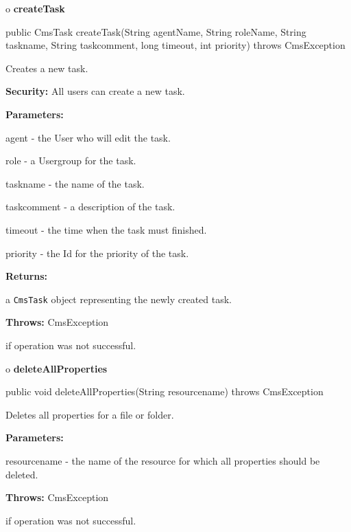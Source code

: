 o {\bf createTask}

\begin{PRE}
 public CmsTask createTask(String agentName,
                           String roleName,
                           String taskname,
                           String taskcomment,
                           long timeout,
                           int priority) throws CmsException
\end{PRE}

\begin{description}
\htmlDD Creates a new task.

{\bf Security:} All users can create a new task.

\begin{description}
\item {\bf Parameters:}

agent - the User who will edit the task.

role - a Usergroup for the task.

taskname - the name of the task.

taskcomment - a description of the task.

timeout - the time when the task must finished.

priority - the Id for the priority of the task.
\item {\bf Returns:}

a {\tt CmsTask} object representing the newly created task.
\item {\bf Throws:} CmsException

if operation was not successful.
\end{description}

\end{description}

o {\bf deleteAllProperties}

\begin{PRE}
 public void deleteAllProperties(String resourcename) throws CmsException
\end{PRE}

\begin{description}
\htmlDD Deletes all properties for a file or folder.

\begin{description}
\item {\bf Parameters:}

resourcename - the name of the resource for which all properties should be
deleted.
\item {\bf Throws:} CmsException

if operation was not successful.
\end{description}

\end{description}

